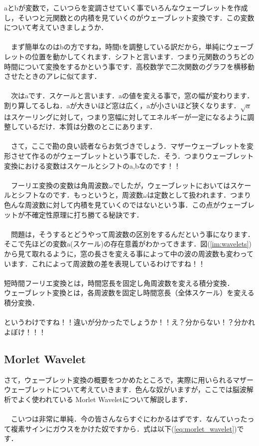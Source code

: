 \documentclass[11pt,a4paper]{ujreport} 	%
\begin{document}
aとbが変数で，こいつらを変調させていく事でいろんなウェーブレットを作成し，そいつと元関数との内積を見ていくのがウェーブレット変換です．この変数について考えていきましょうか．\\
\\
　まず簡単なのはbの方ですね，時間tを調整している訳だから，単純にウェーブレットの位置を動かしてくれます．シフトと言います．つまり元関数のうちどの時間について変換をするかという事です．高校数学で二次関数のグラフを横移動させたときのアレに似てます．\\
\\
　次はaです．スケールと言います．aの値を変える事で，窓の幅が変わります．割り算してるしね．aが大きいほど窓は広く，aが小さいほど狭くなります．$\sqrt{a}$はスケーリングに対して，つまり窓幅に対してエネルギーが一定になるように調整しているだけ．本質は分数のとこにあります．\\
\\
　さて，ここで勘の良い読者ならお気づきでしょう．マザーウェーブレットを変形させて作るのがウェーブレットという事でした．そう．つまりウェーブレット変換における変数はスケールとシフトのa,bなのです！！\\
\\
　フーリエ変換の変数は角周波数$\omega$でしたが，ウェーブレットにおいてはスケールとシフトなのです．もっというと，周波数$\omega$は定数として扱われます．つまり色んな周波数に対して内積を見ていくのではないという事．この点がウェーブレットが不確定性原理に打ち勝てる秘訣です．\\
\\
　問題は，そうするとどうやって周波数の区別をするんだという事になります．そこで先ほどの変数a(スケール)の存在意義がわかってきます．図(\ref{im:wavelets})から見て取れるように，窓の長さを変える事によって中の波の周波数も変わっています．これによって周波数の差を表現しているわけですね！！\\
\\
短時間フーリエ変換とは，時間窓長を固定し角周波数を変える積分変換．\\
ウェーブレット変換とは，各周波数を固定し時間窓長（全体スケール）を変える積分変換．\\
\\
というわけですね！！違いが分かったでしょうか！！え？分からない！？分かれよぼけ！！！\\

\subsection{Morlet Wavelet}
さて，ウェーブレット変換の概要をつかめたところで，実際に用いられるマザーウェーブレットについて考えていきます．色んな奴がいますが，ここでは脳波解析でよく使われている Morlet Waveletについて解説します．\\
\\
　こいつは非常に単純．今の皆さんならすぐにわかるはずです．なんていったって複素サインにガウスをかけた奴ですから．式は以下(\ref{eq:morlet_wavelet})です．
\end{document}
